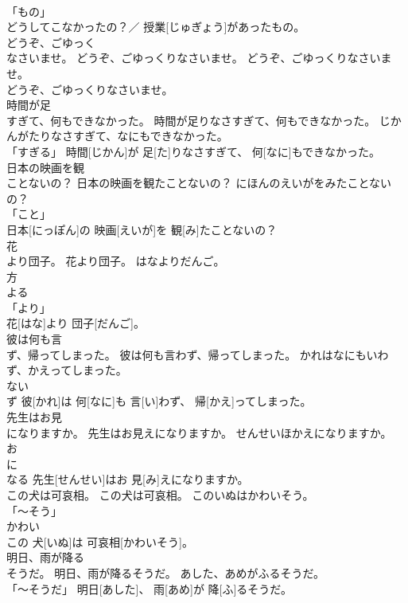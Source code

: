 \documentclass[8pt]{extreport}
\begin{document}
\begin{CJK}{UTF8}{min}
\\	「もの」 
\\	どうしてこなかったの？／ 授業[じゅぎょう]があったもの。		
\\	どうぞ、ごゆっく
\\	なさいませ。	どうぞ、ごゆっくりなさいませ。	どうぞ、ごゆっくりなさいませ。	
\\	どうぞ、ごゆっくりなさいませ。		
\\	時間が足
\\	すぎて、何もできなかった。	時間が足りなさすぎて、何もできなかった。	じかんがたりなさすぎて、なにもできなかった。	
\\	「すぎる」	時間[じかん]が 足[た]りなさすぎて、 何[なに]もできなかった。		
\\	日本の映画を観
\\	ことないの？	日本の映画を観たことないの？	にほんのえいがをみたことないの？	
\\	「こと」 
\\	日本[にっぽん]の 映画[えいが]を 観[み]たことないの？		
\\	花
\\	より団子。	花より団子。	はなよりだんご。	
\\	方 
\\	よる 
\\	「より」 
\\	花[はな]より 団子[だんご]。		
\\	彼は何も言
\\	ず、帰ってしまった。	彼は何も言わず、帰ってしまった。	かれはなにもいわず、かえってしまった。	
\\	ない 
\\	ず	彼[かれ]は 何[なに]も 言[い]わず、 帰[かえ]ってしまった。		
\\	先生はお見
\\	になりますか。	先生はお見えになりますか。	せんせいほかえになりますか。	
\\	お 
\\	に 
\\	なる	先生[せんせい]はお 見[み]えになりますか。		
\\	この犬は可哀相。	この犬は可哀相。	このいぬはかわいそう。	
\\	「～そう」 
\\	かわい 
\\	この 犬[いぬ]は 可哀相[かわいそう]。		
\\	明日、雨が降る
\\	そうだ。	明日、雨が降るそうだ。	あした、あめがふるそうだ。	
\\	「～そうだ」	明日[あした]、 雨[あめ]が 降[ふ]るそうだ。		

\end{CJK}
\end{document}
